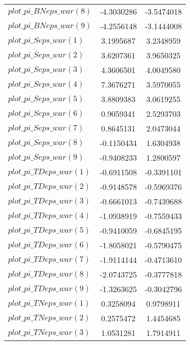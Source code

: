 \begin{center}
\begin{longtable}{lcc}
$plot\_pi\_BN eps\_war (8)   $	 & 	     -4.3030286	 & 	     -3.5474018 \\ 
$plot\_pi\_BN eps\_war (9)   $	 & 	     -4.2556148	 & 	     -3.1444008 \\ 
$plot\_pi\_S eps\_war (1)    $	 & 	      3.1995687	 & 	      3.2348959 \\ 
$plot\_pi\_S eps\_war (2)    $	 & 	      3.6207361	 & 	      3.9650325 \\ 
$plot\_pi\_S eps\_war (3)    $	 & 	      4.3606501	 & 	      4.0049580 \\ 
$plot\_pi\_S eps\_war (4)    $	 & 	      7.3676271	 & 	      3.5970055 \\ 
$plot\_pi\_S eps\_war (5)    $	 & 	      3.8809383	 & 	      3.0619255 \\ 
$plot\_pi\_S eps\_war (6)    $	 & 	      0.9059341	 & 	      2.5293703 \\ 
$plot\_pi\_S eps\_war (7)    $	 & 	      0.8645131	 & 	      2.0473044 \\ 
$plot\_pi\_S eps\_war (8)    $	 & 	     -0.1150434	 & 	      1.6304938 \\ 
$plot\_pi\_S eps\_war (9)    $	 & 	     -0.9408233	 & 	      1.2800597 \\ 
$plot\_pi\_TD eps\_war (1)   $	 & 	     -0.6911508	 & 	     -0.3391101 \\ 
$plot\_pi\_TD eps\_war (2)   $	 & 	     -0.9148578	 & 	     -0.5969376 \\ 
$plot\_pi\_TD eps\_war (3)   $	 & 	     -0.6661013	 & 	     -0.7439688 \\ 
$plot\_pi\_TD eps\_war (4)   $	 & 	     -1.0938919	 & 	     -0.7559433 \\ 
$plot\_pi\_TD eps\_war (5)   $	 & 	     -0.9410059	 & 	     -0.6845195 \\ 
$plot\_pi\_TD eps\_war (6)   $	 & 	     -1.8058021	 & 	     -0.5790475 \\ 
$plot\_pi\_TD eps\_war (7)   $	 & 	     -1.9114144	 & 	     -0.4713610 \\ 
$plot\_pi\_TD eps\_war (8)   $	 & 	     -2.0743725	 & 	     -0.3777818 \\ 
$plot\_pi\_TD eps\_war (9)   $	 & 	     -1.3263625	 & 	     -0.3042796 \\ 
$plot\_pi\_TN eps\_war (1)   $	 & 	      0.3258094	 & 	      0.9798911 \\ 
$plot\_pi\_TN eps\_war (2)   $	 & 	      0.2575472	 & 	      1.4454685 \\ 
$plot\_pi\_TN eps\_war (3)   $	 & 	      1.0531281	 & 	      1.7914911 \\ 

\end{longtable}
\end{center}
